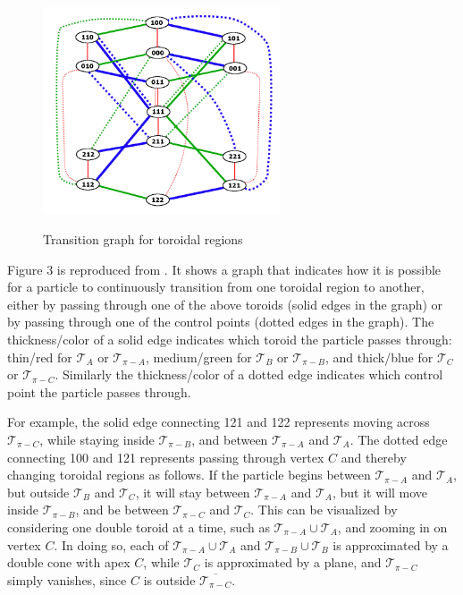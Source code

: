 \documentclass[a4paper, twoside]{article}
\begin{document}
\begin{figure} 
\centerline{ \includegraphics[width=7cm]{RegionsGraph_0.jpg} \ }
\caption{Transition graph for toroidal regions} 
\end{figure} 

Figure 3 is reproduced from \cite{RW}. It shows a graph that indicates how it is possible for a particle to continuously transition from one toroidal region to another, either by passing through one of the above toroids (solid edges in the graph) or by passing through one of the control points (dotted edges in the graph). The thickness/color of a solid edge indicates which toroid the particle passes through: thin/red for $\mathcal{T}_A$ or $\mathcal{T}_{\pi-A}$, medium/green for $\mathcal{T}_B$ or $\mathcal{T}_{\pi-B}$, and thick/blue for $\mathcal{T}_C$ or $\mathcal{T}_{\pi-C}$. Similarly the thickness/color of a dotted edge indicates which control point the particle passes through. 

For example, the solid edge connecting 121 and 122 represents moving across $\mathcal{T}_{\pi-C}$, while staying inside $\mathcal{T}_{\pi-B}$, and between $\mathcal{T}_{\pi-A}$ and $\mathcal{T}_A$. The dotted edge connecting 100 and 121 represents passing through vertex $C$ and thereby changing toroidal regions as follows. If the particle begins between $\mathcal{T}_{\pi-A}$ and $\mathcal{T}_A$, but outside $\mathcal{T}_B$ and $\mathcal{T}_C$, it will stay between $\mathcal{T}_{\pi-A}$ and $\mathcal{T}_A$, but it will move inside $\mathcal{T}_{\pi-B}$, and be between $\mathcal{T}_{\pi-C}$ and $\mathcal{T}_C$. This can be visualized by considering one double toroid at a time, such as $\mathcal{T}_{\pi-A} \cup \mathcal{T}_A$, and zooming in on vertex $C$. In doing so, each of $\mathcal{T}_{\pi-A} \cup \mathcal{T}_A$ and $\mathcal{T}_{\pi-B} \cup \mathcal{T}_B$ is approximated by a double cone with apex $C$, while $\mathcal{T}_C$ is approximated by a plane, and $\mathcal{T}_{\pi-C}$ simply vanishes, since $C$ is outside $\overline{\mathcal{T}_{\pi-C}}$. 
\end{document}
